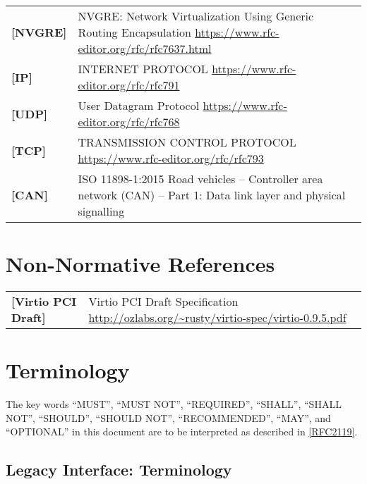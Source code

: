 \begin{longtable}{l p{5in}}
	\label{intro:nvgre}\textbf{[NVGRE]} &
    NVGRE: Network Virtualization Using Generic Routing Encapsulation
	\newline\url{https://www.rfc-editor.org/rfc/rfc7637.html}\\
	\label{intro:IP}\textbf{[IP]} &
    INTERNET PROTOCOL
	\newline\url{https://www.rfc-editor.org/rfc/rfc791}\\
	\label{intro:UDP}\textbf{[UDP]} &
    User Datagram Protocol
	\newline\url{https://www.rfc-editor.org/rfc/rfc768}\\
	\label{intro:TCP}\textbf{[TCP]} &
    TRANSMISSION CONTROL PROTOCOL
	\newline\url{https://www.rfc-editor.org/rfc/rfc793}\\
	\label{intro:CAN}\textbf{[CAN]} &
    ISO 11898-1:2015 Road vehicles -- Controller area network (CAN) -- Part 1: Data link layer and physical signalling\\
\end{longtable}

\section{Non-Normative References}

\begin{longtable}{l p{5in}}
	\label{intro:Virtio PCI Draft}\textbf{[Virtio PCI Draft]} &
	Virtio PCI Draft Specification
	\newline\url{http://ozlabs.org/~rusty/virtio-spec/virtio-0.9.5.pdf}\\
\end{longtable}

\section{Terminology}\label{Terminology}

The key words ``MUST'', ``MUST NOT'', ``REQUIRED'', ``SHALL'', ``SHALL NOT'', ``SHOULD'', ``SHOULD NOT'', ``RECOMMENDED'', ``MAY'', and ``OPTIONAL'' in this document are to be interpreted as described in \hyperref[intro:rfc2119]{[RFC2119]}.

\subsection{Legacy Interface: Terminology}\label{intro:Legacy
Interface: Terminology}

